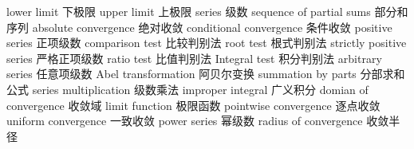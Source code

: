 {lower limit} 
{下极限}
{upper limit} 
{上极限}
{series} 
{级数}
{sequence of partial sums} 
{部分和序列}
{absolute convergence} 
{绝对收敛}
{conditional convergence} 
{条件收敛}
{positive series} 
{正项级数}
{comparison test} 
{比较判别法}
{root test} 
{根式判别法}
{strictly positive series} 
{严格正项级数}
{ratio test} 
{比值判别法}
{Integral test} 
{积分判别法}
{arbitrary series} 
{任意项级数}
{Abel transformation} 
{阿贝尔变换}
{summation by parts} 
{分部求和公式}
{series multiplication} 
{级数乘法}
{improper integral} 
{广义积分}
{domian of convergence} 
{收敛域}
{limit function} 
{极限函数}
{pointwise convergence} 
{逐点收敛}
{uniform convergence} 
{一致收敛}
{power series} 
{幂级数}
{radius of convergence} 
{收敛半径}


